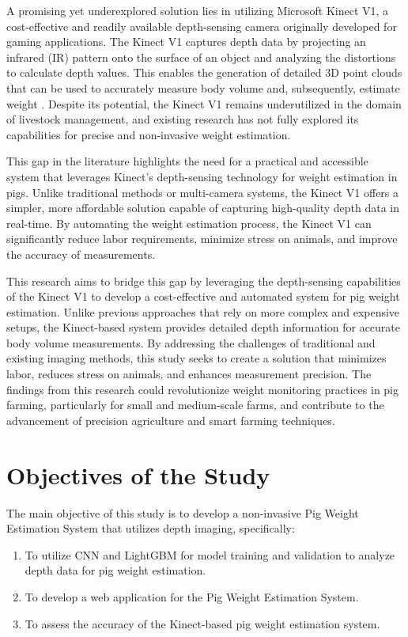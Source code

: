 {A promising yet underexplored solution lies in utilizing Microsoft Kinect V1, a cost-effective and readily available depth-sensing camera originally developed for gaming applications. The Kinect V1 captures depth data by projecting an infrared (IR) pattern onto the surface of an object and analyzing the distortions to calculate depth values. This enables the generation of detailed 3D point clouds that can be used to accurately measure body volume and, subsequently, estimate weight \citep{Zhang2012}. Despite its potential, the Kinect V1 remains underutilized in the domain of livestock management, and existing research has not fully explored its capabilities for precise and non-invasive weight estimation.

This gap in the literature highlights the need for a practical and accessible system that leverages Kinect’s depth-sensing technology for weight estimation in pigs. Unlike traditional methods or multi-camera systems, the Kinect V1 offers a simpler, more affordable solution capable of capturing high-quality depth data in real-time. By automating the weight estimation process, the Kinect V1 can significantly reduce labor requirements, minimize stress on animals, and improve the accuracy of measurements.

This research aims to bridge this gap by leveraging the depth-sensing capabilities of the Kinect V1 to develop a cost-effective and automated system for pig weight estimation. Unlike previous approaches that rely on more complex and expensive setups, the Kinect-based system provides detailed depth information for accurate body volume measurements. By addressing the challenges of traditional and existing imaging methods, this study seeks to create a solution that minimizes labor, reduces stress on animals, and enhances measurement precision. The findings from this research could revolutionize weight monitoring practices in pig farming, particularly for small and medium-scale farms, and contribute to the advancement of precision agriculture and smart farming techniques.


\section{Objectives of the Study}

The main objective of this study is to develop a non-invasive Pig Weight Estimation System that utilizes depth imaging, specifically:
\begin{enumerate}
	\item To utilize CNN and LightGBM for model training and validation to analyze depth data for pig weight estimation. 
	\item To develop a web application for the Pig Weight Estimation System.
	\item To assess the accuracy of the Kinect-based pig weight estimation system.
\end{enumerate}

}
